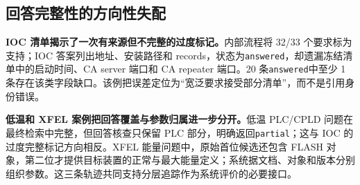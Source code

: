 \subsection{回答完整性的方向性失配}
\label{sec:completeness}
\textbf{IOC 清单揭示了一次有来源但不完整的过度标记。}内部流程将 32/33 个要求标为支持；IOC 答案列出地址、安装路径和 records，状态为\texttt{answered}，却遗漏冻结清单中的启动时间、CA server 端口和 CA repeater 端口。20 条\texttt{answered}中至少 1 条存在该类字段缺口。该例把误差定位为“宽泛要求接受部分清单”，而不是引用身份错误。

\textbf{低温和 XFEL 案例把回答覆盖与参数归属进一步分开。}低温 PLC/CPLD 问题在最终检索中完整，但回答核查只保留 PLC 部分，明确返回\texttt{partial}；这与 IOC 的过度完整标记方向相反。XFEL 能量问题中，原始首位候选还包含 FLASH 对象，第二位才提供目标装置的正常与最大能量定义；系统据文档、对象和版本分别组织参数。这三条轨迹共同支持分层追踪作为系统评价的必要接口。
